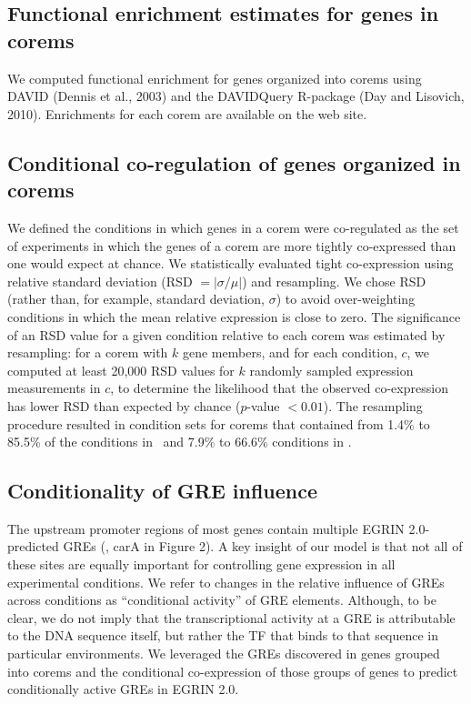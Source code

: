 \subsection{Functional enrichment estimates for genes in corems}

We computed functional enrichment for genes organized into corems
using DAVID (Dennis et al., 2003) and the DAVIDQuery R-package (Day
and Lisovich, 2010). Enrichments for each corem are available on the
web site.

\subsection{Conditional co-regulation of genes organized in corems}

We defined the conditions in which genes in a corem were co-regulated
as the set of experiments in which the genes of a corem are more
tightly co-expressed than one would expect at chance. We statistically
evaluated tight co-expression using relative standard deviation (RSD 
$=|\sigma/\mu|$) and resampling. We chose RSD (rather than, for example,
standard deviation, $\sigma$) to avoid over-weighting conditions in which the
mean relative expression is close to zero. The significance of an RSD
value for a given condition relative to each corem was estimated
by resampling: for a corem with $k$ gene members, and for each
condition, $c$, we computed at least 20,000 RSD values for $k$ randomly
sampled expression measurements in $c$, to determine the likelihood that the
observed co-expression has lower RSD than expected by chance ($p$-value
$< 0.01$). The resampling procedure resulted in condition sets for
corems that contained from 1.4\% to 85.5\% of the conditions in
\halo\ and 7.9\% to 66.6\% conditions in \eco.

\subsection{Conditionality of GRE influence}

The upstream promoter regions of most genes contain multiple EGRIN
2.0-predicted GREs (\eg, carA in Figure 2). A key insight of our
model is that not all of these sites are equally important for
controlling gene expression in all experimental conditions. We refer
to changes in the relative influence of GREs across conditions as
“conditional activity” of GRE elements. Although, to be clear, we do
not imply that the transcriptional activity at a GRE is attributable
to the DNA sequence itself, but rather the TF that binds to that
sequence in particular environments. We leveraged the GREs discovered
in genes grouped into corems and the conditional co-expression of
those groups of genes to predict conditionally active GREs in EGRIN
2.0.

